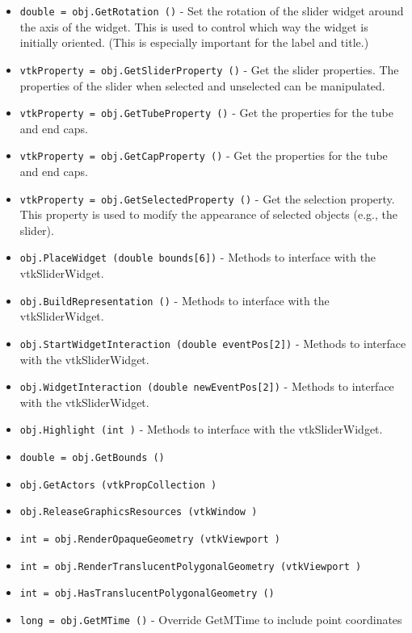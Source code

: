 \begin{itemize}
\item  \verb|double = obj.GetRotation ()| -  Set the rotation of the slider widget around the axis of the widget. This is
 used to control which way the widget is initially oriented. (This is especially
 important for the label and title.)

\item  \verb|vtkProperty = obj.GetSliderProperty ()| -  Get the slider properties. The properties of the slider when selected 
 and unselected can be manipulated.

\item  \verb|vtkProperty = obj.GetTubeProperty ()| -  Get the properties for the tube and end caps. 

\item  \verb|vtkProperty = obj.GetCapProperty ()| -  Get the properties for the tube and end caps. 

\item  \verb|vtkProperty = obj.GetSelectedProperty ()| -  Get the selection property. This property is used to modify the appearance of
 selected objects (e.g., the slider).

\item  \verb|obj.PlaceWidget (double bounds[6])| -  Methods to interface with the vtkSliderWidget.

\item  \verb|obj.BuildRepresentation ()| -  Methods to interface with the vtkSliderWidget.

\item  \verb|obj.StartWidgetInteraction (double eventPos[2])| -  Methods to interface with the vtkSliderWidget.

\item  \verb|obj.WidgetInteraction (double newEventPos[2])| -  Methods to interface with the vtkSliderWidget.

\item  \verb|obj.Highlight (int )| -  Methods to interface with the vtkSliderWidget.

\item  \verb|double = obj.GetBounds ()|

\item  \verb|obj.GetActors (vtkPropCollection )|

\item  \verb|obj.ReleaseGraphicsResources (vtkWindow )|

\item  \verb|int = obj.RenderOpaqueGeometry (vtkViewport )|

\item  \verb|int = obj.RenderTranslucentPolygonalGeometry (vtkViewport )|

\item  \verb|int = obj.HasTranslucentPolygonalGeometry ()|

\item  \verb|long = obj.GetMTime ()| -  Override GetMTime to include point coordinates

\end{itemize}
